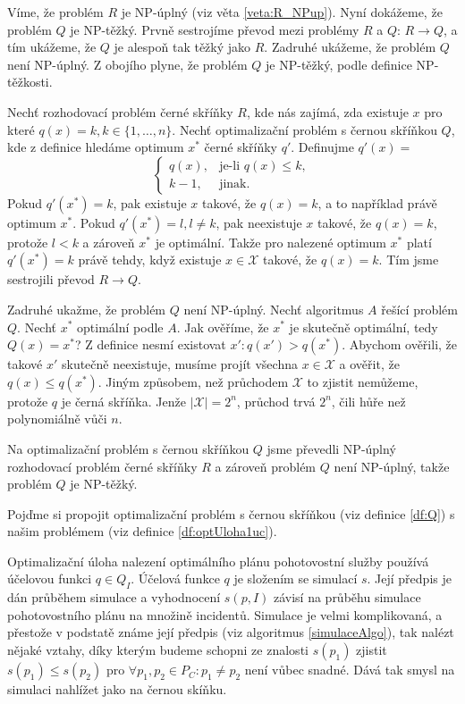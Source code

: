 \begin{dukaz}
  Víme, že problém $R$ je NP-úplný (viz věta \ref{veta:R_NPup}). Nyní dokážeme, že problém $Q$ je NP-těžký.
  Prvně sestrojíme převod mezi problémy $R$ a $Q$: $R \rightarrow Q$, a tím ukážeme, že $Q$ je alespoň tak těžký jako $R$.
  Zadruhé ukážeme, že problém $Q$ není NP-úplný.
  Z obojího plyne, že problém $Q$ je NP-těžký, podle definice NP-těžkosti.

  Nechť rozhodovací problém černé skříňky $R$, kde nás zajímá, zda existuje $x$ pro které $q(x) = k, k \in \{ 1, \dots, n\}$. 
  Nechť optimalizační problém s černou skříňkou $Q$, kde z definice hledáme optimum $x^*$ černé skříňky $q'$.
  Definujme $q'(x) = $
  \[
  \begin{cases}
    q(x), & \text{je-li $q(x) \leq k$},\\
    k - 1, & \text{jinak}.
  \end{cases}
  \]
  Pokud $q'(x^*) = k$, pak existuje $x$ takové, že $q(x) = k$, a to například právě optimum $x^*$.
  Pokud $q'(x^*) = l, l \neq k$, pak neexistuje $x$ takové, že $q(x) = k$, protože $l < k$ a zároveň $x^*$ je optimální.
  Takže pro nalezené optimum $x^*$ platí $q'(x^*) = k$ právě tehdy, když existuje $x \in \mathcal{X}$ takové, že $q(x) = k$.
  Tím jsme sestrojili převod $R \rightarrow Q$.

  Zadruhé ukažme, že problém $Q$ není NP-úplný.
  Nechť algoritmus $A$ řešící problém $Q$.
  Nechť $x^*$ optimální podle $A$. Jak ověříme, že $x^*$ je skutečně optimální, tedy $Q(x) = x^*$?
  Z definice nesmí existovat $x' \colon q(x') > q(x^*)$.
  Abychom ověřili, že takové $x'$ skutečně neexistuje, musíme projít všechna $x \in \mathcal{X}$ a ověřit, že $q(x) \leq q(x^*)$.
  Jiným způsobem, než průchodem $\mathcal{X}$ to zjistit nemůžeme, protože $q$ je černá skříňka.
  Jenže $|\mathcal{X}| = 2^n$, průchod trvá $2^n$, čili hůře než polynomiálně vůči $n$.

  Na optimalizační problém s černou skříňkou $Q$ jsme převedli NP-úplný rozhodovací problém černé skříňky $R$ a zároveň
  problém $Q$ není NP-úplný, takže problém $Q$ je NP-těžký.
\end{dukaz}

Pojďme si propojit optimalizační problém s černou skříňkou (viz definice \ref{df:Q}) s našim problémem (viz definice \ref{df:optUloha1uc}). 

Optimalizační úloha nalezení optimálního plánu pohotovostní služby používá účelovou funkci $q \in Q_I$.
Účelová funkce $q$ je složením se simulací $s$.
Její předpis je dán průběhem simulace a vyhodnocení $s(p, I)$ závisí na průběhu simulace pohotovostního plánu na množině incidentů.
Simulace je velmi komplikovaná, a přestože v podstatě známe její předpis (viz algoritmus \ref{simulaceAlgo}),
tak nalézt nějaké vztahy, díky kterým budeme schopni ze znalosti $s(p_1)$ zjistit $s(p_1) \leq s(p_2)$ pro $\forall p_1, p_2 \in P_C \colon p_1 \neq p_2$ není vůbec snadné.
Dává tak smysl na simulaci nahlížet jako na černou skíňku.

